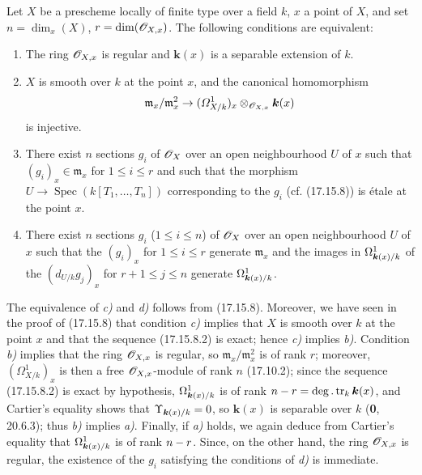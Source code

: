 \begin{corollary}[17.15.9]
\label{IV.17.15.9}
Let $X$ be a prescheme locally of finite type over a field $k$, $x$ a point of $X$, and set $n=\dim_x(X)$, $r=\dim(\mathscr{O}_{X,x})$. The following conditions are equivalent:
\begin{enumerate}
  \item[\textup{a)}] The ring $\mathscr{O}_{X,x}$ is regular and $\boldsymbol{k}(x)$ is a separable extension of $k$.
  \item[\textup{b)}] $X$ is smooth over $k$ at the point $x$, and the canonical homomorphism
  \[
  \mathfrak m_x/\mathfrak m_x^2\to(\varOmega^1_{X/k})_x\otimes_{\mathscr{O}_{X,x}}\boldsymbol{k}(x)
  \]
  is injective.
  \item[\textup{c)}] There exist $n$ sections $g_i$ of $\mathscr{O}_X$ over an open neighbourhood $U$ of $x$ such that $(g_i)_x\in\mathfrak m_x$ for $1\leq i\leq r$ and such that the morphism $U\to\operatorname{Spec}(k[T_1,\ldots,T_n])$ corresponding to the $g_i$ (cf. (17.15.8)) is étale at the point $x$.
  \item[\textup{d)}] There exist $n$ sections $g_i$ \textup{(}$1\leq i\leq n$\textup{)} of $\mathscr{O}_X$ over an open neighbourhood $U$ of $x$ such that the $(g_i)_x$ for $1\leq i\leq r$ generate $\mathfrak m_x$ and the images in $\Omega^1_{\boldsymbol{k}(x)/k}$ of the $(d_{U/k}g_j)_x$ for $r+1\leq j\leq n$ generate $\Omega^1_{\boldsymbol{k}(x)/k}$.
\end{enumerate}
\end{corollary}

The equivalence of \emph{c)} and \emph{d)} follows from (17.15.8). Moreover, we have seen in the proof of (17.15.8) that condition \emph{c)} implies that $X$ is smooth over $k$ at the point $x$ and that the sequence (17.15.8.2) is exact; hence \emph{c)} implies \emph{b)}. Condition \emph{b)} implies that the ring $\mathscr{O}_{X,x}$ is regular, so $\mathfrak m_x/\mathfrak m_x^2$ is of rank $r$; moreover, $(\varOmega^1_{X/k})_x$ is then a free $\mathscr{O}_{X,x}$-module of rank $n$ (17.10.2); since the sequence (17.15.8.2) is exact by hypothesis, $\Omega^1_{\boldsymbol{k}(x)/k}$ is of rank $n- r=\deg.\operatorname{tr}_k \boldsymbol{k}(x)$, and Cartier's equality shows that $\Upsilon_{\boldsymbol{k}(x)/k}=0$, so $\boldsymbol{k}(x)$ is separable over $k$ (\textbf{0}, 20.6.3); thus \emph{b)} implies \emph{a)}. Finally, if \emph{a)}
holds, we again deduce from Cartier's equality that $\Omega^1_{\boldsymbol{k}(x)/k}$ is of rank $n- r$. Since, on the other hand, the ring $\mathscr{O}_{X,x}$ is regular, the existence of the $g_i$ satisfying the conditions of \emph{d)} is immediate.

